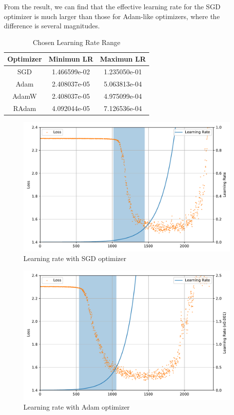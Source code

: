\documentclass{article}
\begin{document}
From the result, we can find that the effective learning rate for the SGD optimizer is much larger than those for Adam-like optimizers, where the difference is several magnitudes.

\begin{table}[ht!]
    \centering
    \caption{Chosen Learning Rate Range}\label{tab:lr_range}
    \begin{tabular}{ccc}
        \toprule
        Optimizer & Minimun LR   & Maximun LR   \\
        \midrule
        SGD       & 1.466599e-02 & 1.235050e-01 \\
        Adam      & 2.408037e-05 & 5.063813e-04 \\
        AdamW     & 2.408037e-05 & 4.975099e-04 \\
        RAdam     & 4.092044e-05 & 7.126536e-04 \\
        \bottomrule
    \end{tabular}
\end{table}

\begin{figure}[ht!]
    \centering
    \includegraphics[scale=0.64]{images/lr_range_sgd.pdf}
    \caption{Learning rate with SGD optimizer}\label{fig:lr_range_sgd}
\end{figure}

\begin{figure}[ht!]
    \centering
    \includegraphics[scale=0.64]{images/lr_range_adam.pdf}
    \caption{Learning rate with Adam optimizer}\label{fig:lr_range_adam}
\end{figure}
\end{document}
